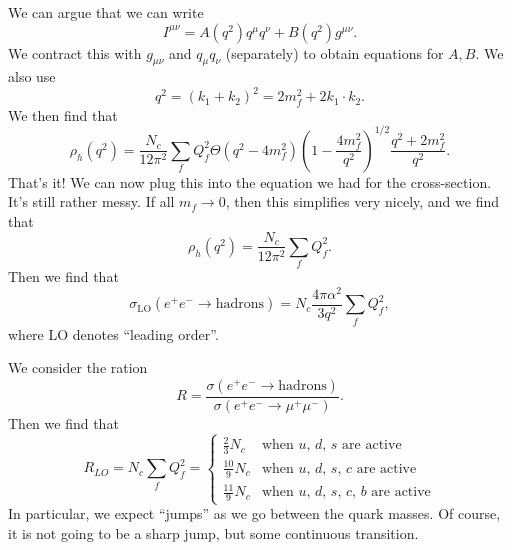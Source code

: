 \documentclass[a4paper]{article}
\begin{document}
We can argue that we can write
\[
  I^{\mu\nu} = A(q^2) q^\mu q^\nu + B(q^2) g^{\mu\nu}.
\]
We contract this with $g_{\mu\nu}$ and $q_\mu q_\nu$ (separately) to obtain equations for $A, B$. We also use
\[
  q^2 = (k_1 + k_2)^2 = 2 m_f^2 + 2 k_1 \cdot k_2.
\]
We then find that
\[
  \rho_h(q^2) = \frac{N_c}{12 \pi^2} \sum_f Q_f^2 \Theta(q^2 - 4 m_f^2)\left(1 - \frac{4 m_f^2}{q^2}\right)^{1/2} \frac{q^2 + 2 m_f^2}{q^2}.
\]
That's it! We can now plug this into the equation we had for the cross-section. It's still rather messy. If all $m_f \to 0$, then this simplifies very nicely, and we find that
\[
  \rho_h(q^2) = \frac{N_c}{12 \pi^2} \sum_f Q_f^2.
\]
Then we find that
\[
  \sigma_{\mathrm{LO}}(e^+ e^- \to \mathrm{hadrons}) = N_c \frac{4\pi \alpha^2}{3q^2} \sum_f Q_f^2,
\]
where LO denotes ``leading order''.

We consider the ration
\[
  R = \frac{\sigma(e^+ e^- \to \mathrm{hadrons})}{\sigma(e^+ e^- \to \mu^+ \mu^-)}.
\]
Then we find that
\[
  R_{LO} = N_c \sum_f Q_f^2 =
  \begin{cases}
    \frac{2}{3} N_c & \text{when $u$, $d$, $s$ are active}\\
    \frac{10}{9} N_c & \text{when $u$, $d$, $s$, $c$ are active}\\
    \frac{11}{9} N_c & \text{when $u$, $d$, $s$, $c$, $b$ are active}
  \end{cases}
\]
In particular, we expect ``jumps'' as we go between the quark masses. Of course, it is not going to be a sharp jump, but some continuous transition.
\end{document}
